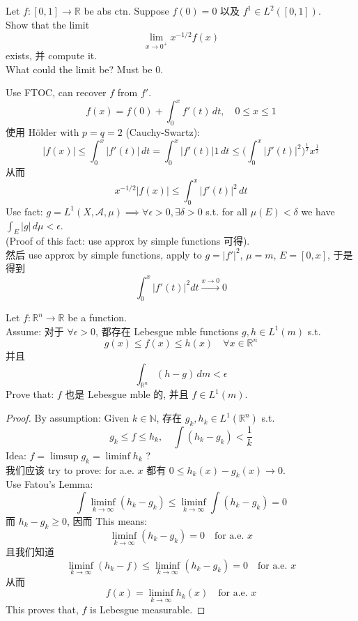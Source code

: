 \documentclass[lang=cn,11pt]{elegantbook}
\begin{document}
\begin{example}
    Let $f:[0,1] \to \mathbb{R}$ be abs ctn. Suppose $f(0)  = 0$ 以及 $f^1 \in L^2([0,1])$.\\
    Show that the limit \[
    \lim_{x \to 0^+} x^{-1/2} f(x)
    \]exists, 并 compute it.\\
    What could the limit be? Must be $0$.\\
\begin{solution}
    Use FTOC, can recover $f$ from $f'$.\\
    \[
    f(x) = f(0) + \int_0^x f'(t) \, dt,\quad 0\leq x \leq 1
    \]
    使用 Hölder with $p=q =2$ (Cauchy-Swartz): \[
    |f(x)| \leq \int_0^x |f'(t)| \, dt = \int_0^x |f'(t) | 1\, dt  \leq \bigg(\int_0^x |f'(t)|^2\bigg)^\frac{1}{2} x^{\frac{1}{2}}
    \]
    从而 \[
    x^{-1/2} |f(x)| \leq \int_0^x |f'(t) | ^2 \, dt 
    \]
    Use fact: \(    g = L^1 (X,\mathcal{A},\mu) \implies \forall \epsilon > 0, \exists \delta > 0\) s.t. for all $\mu(E) < \delta $ we have $\int_E |g| \, d\mu < \epsilon$.\\
  (Proof of this fact: use approx by simple functions 可得).\\
  然后 use approx by simple functions, apply to $g = |f'|^2$, $\mu = m$, $E = [0,x]$, 于是得到 \[
  \int_0^x |f'(t)| ^2 dt \overset{x\to 0}{\longrightarrow} 0
  \]
\end{solution}
\end{example}


\begin{example}
    Let $f: \mathbb{R}^n \to \mathbb{R}$ be a function.\\
    Assume: 对于 $\forall \epsilon > 0$, 都存在 Lebesgue mble functions $g,h\in L^1 (m)$  s.t. \[
    g(x) \leq f(x) \leq h(x) \quad \forall x \in \mathbb{R}^n
    \]并且 \[
    \int_{\mathbb{R}^n} (h-g) \, dm < \epsilon 
    \]
    Prove that: $f$ 也是 Lebesgue mble 的, 并且 $f\in L^1(m)$.\\
   \begin{proof}
By assumption: Given $k \in \mathbb{N}$, 存在 $g_k,h_k \in L^1(\mathbb{R}^n)$ s.t.  \[   g_k \leq f \leq h_k ,\quad \int (h_k - g_k) < \frac{1}{k}\]
Idea: $f = \limsup g_k = \liminf h_k$ ? \\
我们应该 try to prove: for a.e. $x$ 都有 $ 0\leq h_k(x) - g_k (x) \to 0$.\\
Use Fatou's Lemma: \[
\int \liminf_{k\to \infty} (h_k - g_k) \leq \liminf_{k\to \infty} \int (h_k - g_k)  = 0
\]而 $h_k - g_k \geq 0$, 因而 This means: \[
 \liminf_{k\to \infty} (h_k - g_k) = 0\quad \text{for a.e. } x
\]
且我们知道\[
\liminf_{k\to \infty} (h_k - f)\leq \liminf_{k\to \infty}  (h_k - g_k) = 0\quad \text{for a.e. } x
\]
从而 \[
f(x) = \liminf_{k\to \infty} h_k(x) \quad \text{for a.e. } x
\]
This proves that, $f$ is Lebesgue measurable.
   
   \end{proof}
\end{example}
\end{document}
